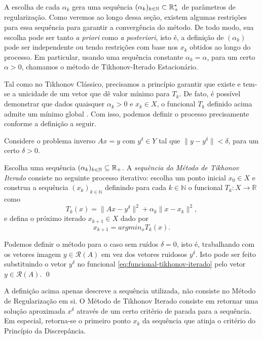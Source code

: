 A escolha de cada $\alpha_k$ gera uma sequência $(\alpha_k)_{k\in \mathbb N} \subset \mathbb{R}^*_+$ de parâmetros de regularização. Como veremos ao longo dessa seção, existem algumas restrições para essa sequência para garantir a convergência do método. De todo modo, sua escolha pode ser tanto \textit{a priori} como \textit{a posteriori}, isto é, a definição de $(\alpha_k)$ pode ser independente ou tendo restrições com base nos $x_k$ obtidos ao longo do processo. Em particular, usando uma sequência constante $\alpha_k = \alpha$, para um certo $\alpha>0$, chamamos o método de Tikhonov-Iterado Estacionário. 

Tal como no Tikhonov Clássico, precisamos a princípio garantir que existe e tem-se a unicidade de um vetor que dê valor mínimo para $T_k$. De fato, é possível demonstrar que dados quaisquer $\alpha_k>0$ e $x_k\in X$, o funcional $T_k$ definido acima admite um mínimo global \cite{???}. Com isso, podemos definir o processo precisamente conforme a definição a seguir.

\begin{defin} \label{def:tikhonov-iterado}
    Considere o problema inverso $Ax=y$ com $y^\delta \in Y$ tal que $\| y - y^\delta\|<\delta$, para um certo $\delta>0$. 

    Escolha uma sequência $(\alpha_k)_{k \in \mathbb N} \subseteq \mathbb{R}_+$. A \textit{sequência do Método de Tikhonov Iterado} consiste no seguinte processo iterativo: escolha um ponto inicial $x_0 \in X$ e construa a sequência $(x_k)_{k\in \mathbb N}$ definindo para cada $k\in \mathbb N$ o funcional $T_k : X \to \mathbb R$ como
    \begin{equation}\label{eq:funcional-tikhonov-iterado}
        T_k(x) = \| Ax - y^\delta \|^2 + \alpha_k \| x - x_k \|^2,
    \end{equation}
    e defina o próximo iterado $x_{k+1} \in X$ dado por
    \begin{equation}
        x_{k+1} = argmin_x T_k (x).
    \end{equation}
    
Podemos definir o método para o caso sem ruídos $\delta = 0$, isto é, trabalhando com os vetores imagem $y \in \mathcal R(A)$ em vez dos vetores ruidosos $y^\delta$. Isto pode ser feito substituindo o vetor $y^\delta$ no funcional \eqref{eq:funcional-tikhonov-iterado} pelo vetor $y \in \mathcal R(A)$. \qed
\end{defin}

A definição acima apenas descreve a sequência utilizada, não consiste no Método de Regularização em si. O Método de Tikhonov Iterado consiste em retornar uma solução aproximada $x^\delta$ através de um certo critério de parada para a sequência. Em especial, retorna-se o primeiro ponto $x_k$ da sequência que atinja o critério do Princípio da Discrepância.

